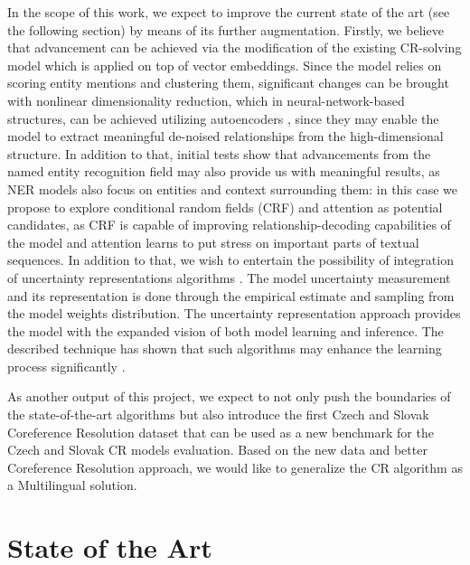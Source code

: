 In the scope of this work, we expect to improve the current state of the art (see the following section) by means of its further augmentation. 
Firstly, we believe that advancement can be achieved via the modification of the existing CR-solving model which is applied on top of vector embeddings. 
Since the model relies on scoring entity mentions and clustering them, significant changes can be brought with nonlinear dimensionality reduction, which in neural-network-based structures, can be achieved utilizing autoencoders \cite{autoencoders-Zabalza2016,autoencoders-Sahay2019}, since they may enable the model to extract meaningful de-noised relationships from the high-dimensional structure. 
In addition to that, initial tests show that advancements from the named entity recognition field may also provide us with meaningful results, as NER models also focus on entities and context surrounding them: in this case we propose to explore conditional random fields (CRF) \cite{ner-Strakova2019,ner-Zhanming2019,ner-Zhanming2019} and attention \cite{ner-Yamada2020} as potential candidates, as CRF is capable of improving relationship-decoding capabilities of the model and attention learns to put stress on important parts of textual sequences. 
In addition to that, we wish to entertain the possibility of integration of uncertainty representations algorithms \cite{lakshminarayanan2016simple, gal2017deep,welling2011bayesian}. 
The model uncertainty measurement and its representation is done through the empirical estimate and sampling from the model weights distribution. 
The uncertainty representation approach provides the model with the expanded vision of both model learning and inference. 
The described technique has shown that such algorithms may enhance the learning process significantly \cite{ovadia2019can}.

As another output of this project, we expect to not only push the boundaries of the state-of-the-art algorithms but also introduce the first Czech and Slovak Coreference Resolution dataset that can be used as a new benchmark for the Czech and Slovak CR models evaluation. Based on the new data and better Coreference Resolution approach, we would like to generalize the CR algorithm as a Multilingual solution.


\section{State of the Art}\label{sec:sota}

